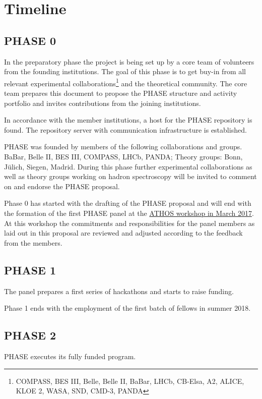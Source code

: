\section{Timeline}

\subsection{PHASE 0}
In the preparatory phase the project is being set up by a core team of volunteers from the founding institutions. The goal of this phase is to get buy-in from all relevant
experimental collaborations\footnote{COMPASS, BES III, Belle, Belle II, BaBar, LHCb, CB-Elsa, A2, ALICE, KLOE 2, WASA, SND, CMD-3, PANDA} and the theoretical community.  The core team prepares this document to propose the PHASE structure and activity portfolio and invites contributions from the joining institutions.

In accordance with the member institutions, a host for the PHASE repository is found. The repository server with communication infrastructure is established.

PHASE was founded by members of the following collaborations and groups. BaBar, Belle II, BES III, COMPASS, LHCb, PANDA; Theory groups: Bonn, J\"ulich, Siegen, Madrid.
During this phase further experimental collaborations as well as theory groups working on hadron spectroscopy will be invited to comment on and endorse the PHASE proposal. 

Phase 0 has started with the drafting of the PHASE proposal and will end with the formation of the first PHASE panel at the \href{https://indico.cern.ch/event/591374/}{ATHOS workshop in March 2017}. At this workshop the commitments and responsibilities for the panel members as laid out in this proposal are reviewed and adjusted according to the feedback from the members.

\subsection{PHASE 1}
The panel prepares a first series of hackathons and starts to raise funding.

Phase 1 ends with the employment of the first batch of fellows in summer 2018.
\subsection{PHASE 2}
PHASE executes its fully funded program.